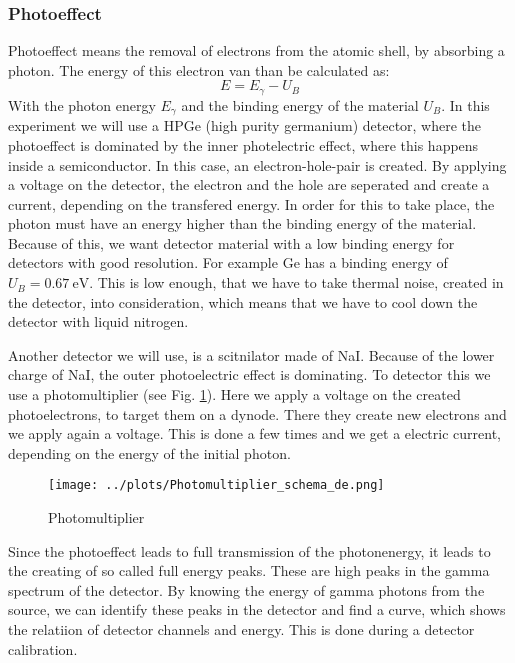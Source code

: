 \subsubsection{Photoeffect}

Photoeffect means the removal of electrons from the atomic shell, by absorbing a photon.
The energy of this electron van than be calculated as:
\begin{equation}
E = E_{\gamma} - U_B
\end{equation}
With the photon energy $E_{\gamma}$ and the binding energy of the material $U_B$.
In this experiment we will use a HPGe (high purity germanium) detector, where the photoeffect is dominated by the inner photelectric effect, where this happens inside a semiconductor.
In this case, an electron-hole-pair is created.
By applying a voltage on the detector, the electron and the hole are seperated and create a current, depending on the transfered energy.
In order for this to take place, the photon must have an energy higher than the binding energy of the material.
Because of this, we want detector material with a low binding energy for detectors with good resolution.
For example Ge has a binding energy of $U_B = \SI{0.67}{\electronvolt} $.
This is low enough, that we have to take thermal noise, created in the detector, into consideration, which means that we have to cool down the detector with liquid nitrogen.

Another detector we will use, is a scitnilator made of NaI.
Because of the lower charge of NaI, the outer photoelectric effect is dominating.
To detector this we use a photomultiplier (see Fig. \ref{theorie_PEV}).
Here we apply a voltage on the created photoelectrons, to target them on a dynode.
There they create new electrons and we apply again a voltage.
This is done a few times and we get a electric current, depending on the energy of the initial photon.

\begin{figure}[ht]
	\centering
    \texttt{[image: ../plots/Photomultiplier\_schema\_de.png]}
	\caption{Photomultiplier \cite{Bild_Photomultiplier}}
	\label{theorie_PEV}
\end{figure}

Since the photoeffect leads to full transmission of the photonenergy, it leads to the creating of so called full energy peaks.
These are high peaks in the gamma spectrum of the detector.
By knowing the energy of gamma photons from the source, we can identify these peaks in the detector and find a curve, which shows the relatiion of detector channels and energy.
This is done during a detector calibration.


